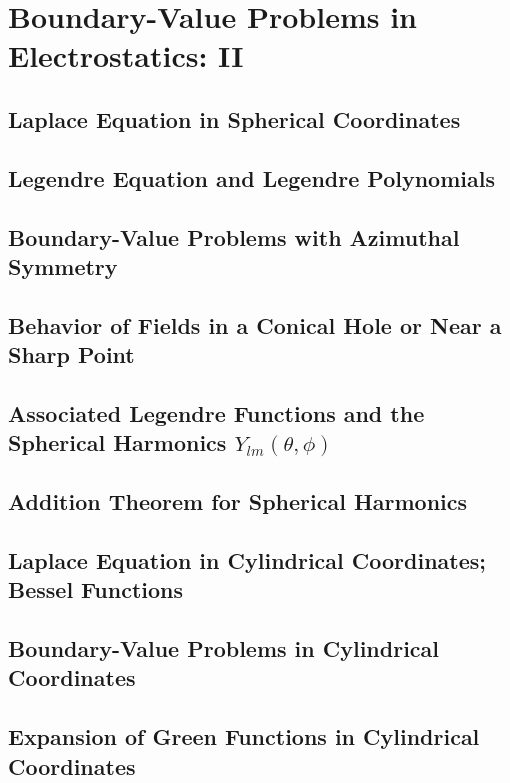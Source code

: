 \setcounter{chapter}{0}
\renewcommand{\thechapter}{3}
\chapter{Boundary-Value Problems in Electrostatics: II}
\setcounter{equation}{0}	        %

\section{Laplace Equation in Spherical Coordinates}

\section{Legendre Equation and Legendre Polynomials}

\section{Boundary-Value Problems with Azimuthal Symmetry}

\section{Behavior of Fields in a  Conical Hole or Near a Sharp Point}

\section{Associated Legendre Functions and the Spherical Harmonics $Y_{l m}(\theta, \phi)$}

\section{Addition Theorem for Spherical Harmonics}

\section{Laplace Equation in Cylindrical Coordinates; Bessel Functions}

\section{Boundary-Value Problems in Cylindrical Coordinates}

\section{Expansion of Green Functions in Cylindrical Coordinates}

